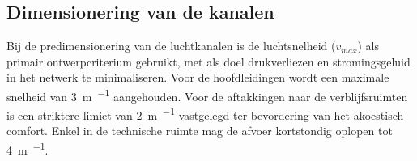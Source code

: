 \documentclass[a4paper,12pt]{article}
\begin{document}
\begin{table}[!ht]
    \centering
    \caption{Overzicht van de berekende doorstroomdebieten en vereiste spleetonder deuren.}
    \label{tab:doorstroom}
\end{table}



\subsection{Dimensionering van de kanalen}
Bij de predimensionering van de luchtkanalen is de luchtsnelheid ($v_{max}$) als primair ontwerpcriterium gebruikt, met als doel drukverliezen en stromingsgeluid in het netwerk te minimaliseren. Voor de hoofdleidingen wordt een maximale snelheid van \qty{3}{\meter\per\sec} aangehouden. Voor de aftakkingen naar de verblijfsruimten is een striktere limiet van \qty{2}{\meter\per\sec} vastgelegd ter bevordering van het akoestisch comfort. Enkel in de technische ruimte mag de afvoer kortstondig oplopen tot \qty{4}{\meter\per\sec}.
\end{document}
